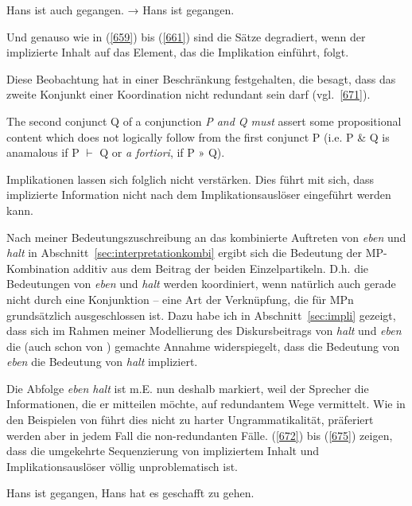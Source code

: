 \begin{exe}
	\ex\label{670} 
	Hans ist auch gegangen. → Hans ist gegangen.
\end{exe}
Und genauso wie in (\ref{659}) bis (\ref{661}) sind die Sätze degradiert, wenn der implizierte Inhalt auf das Element, das die Implikation einführt, folgt.

Diese Beobachtung hat \citet{Horn1976} in einer Beschränkung festgehalten, die besagt, dass das zweite Konjunkt einer Koordination nicht redundant sein darf (vgl.\ \ref{671}).

\begin{exe}
	\ex\label{671} 
	The second conjunct Q of a conjunction \textit{P and Q must} assert some propositional content which does not logically 		follow from the first conjunct P (i.e. P \& Q is anamalous if P $\vdash$ Q or \textit{a fortiori}, if P » Q).	
	\hfill\hbox{\citet[65]{Horn1976}}
\end{exe}	
Implikationen lassen sich folglich nicht verstärken. Dies führt mit sich, dass implizierte Information nicht nach dem Implikationsauslöser eingeführt werden kann. 

Nach meiner Bedeutungszuschreibung an das kombinierte Auftreten von \textit{eben} und \textit{halt} in Abschnitt~\ref{sec:interpretationkombi} ergibt sich die Bedeutung der MP-Kombination additiv aus dem Beitrag der beiden Einzelpartikeln. D.h. die Bedeutungen von \textit{eben} und \textit{halt} werden koordiniert, wenn natürlich auch gerade nicht durch eine Konjunktion – eine Art der Verknüpfung, die für MPn grundsätzlich ausgeschlossen ist. Dazu habe ich in Abschnitt~\ref{sec:impli} gezeigt, dass sich im Rahmen meiner Mo\-dellierung des Diskursbeitrags von \textit{halt} und \textit{eben} die (auch schon von \citealt{Thurmair1989}) gemachte Annahme widerspiegelt, dass die Bedeutung von \textit{eben} die Bedeutung von \textit{halt} impliziert.

Die Abfolge \textit{eben halt} ist m.E. nun deshalb markiert, weil der Sprecher die Informationen, die er mitteilen möchte, auf redundantem  Wege vermittelt. Wie in den Beispielen von \citet{Horn1976} führt dies nicht zu harter Ungrammatikalität, präferiert werden aber in jedem Fall die non-redundanten Fälle. (\ref{672}) bis (\ref{675}) zeigen, dass die umgekehrte Sequenzierung von impliziertem Inhalt und Implikationsauslöser völlig unproblematisch ist.

\begin{exe}
	\ex\label{672} 
	Hans ist gegangen, Hans hat es geschafft zu gehen.
\end{exe}

